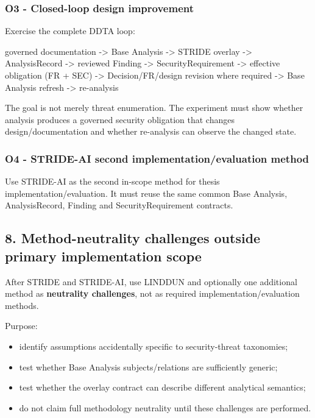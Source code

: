 \documentclass[
  11pt,
  a4paper,
]{article}
\newenvironment{Shaded}{}{}
\newcommand{\NormalTok}[1]{#1}
\providecommand{\tightlist}{%
  \setlength{\itemsep}{0pt}\setlength{\parskip}{0pt}}
\begin{document}
\subsubsection{O3 - Closed-loop design
improvement}\label{o3---closed-loop-design-improvement}

Exercise the complete DDTA loop:

\begin{Shaded}
\begin{Highlighting}[]
\NormalTok{governed documentation}
\NormalTok{ {-}\textgreater{} Base Analysis}
\NormalTok{ {-}\textgreater{} STRIDE overlay}
\NormalTok{ {-}\textgreater{} AnalysisRecord}
\NormalTok{ {-}\textgreater{} reviewed Finding}
\NormalTok{ {-}\textgreater{} SecurityRequirement}
\NormalTok{ {-}\textgreater{} effective obligation (FR + SEC)}
\NormalTok{ {-}\textgreater{} Decision/FR/design revision where required}
\NormalTok{ {-}\textgreater{} Base Analysis refresh}
\NormalTok{ {-}\textgreater{} re{-}analysis}
\end{Highlighting}
\end{Shaded}

The goal is not merely threat enumeration. The experiment must show
whether analysis produces a governed security obligation that changes
design/documentation and whether re-analysis can observe the changed
state.

\subsubsection{O4 - STRIDE-AI second implementation/evaluation
method}\label{o4---stride-ai-second-implementationevaluation-method}

Use STRIDE-AI as the second in-scope method for thesis
implementation/evaluation. It must reuse the same common Base Analysis,
AnalysisRecord, Finding and SecurityRequirement contracts.

\subsection{8. Method-neutrality challenges outside primary
implementation
scope}\label{method-neutrality-challenges-outside-primary-implementation-scope}

After STRIDE and STRIDE-AI, use LINDDUN and optionally one additional
method as \textbf{neutrality challenges}, not as required
implementation/evaluation methods.

Purpose:

\begin{itemize}
\tightlist
\item
  identify assumptions accidentally specific to security-threat
  taxonomies;
\item
  test whether Base Analysis subjects/relations are sufficiently
  generic;
\item
  test whether the overlay contract can describe different analytical
  semantics;
\item
  do not claim full methodology neutrality until these challenges are
  performed.
\end{itemize}
\end{document}

